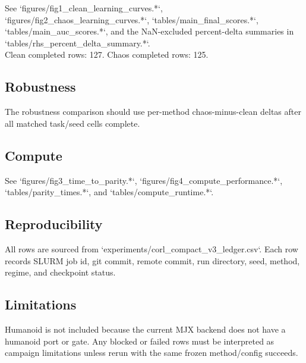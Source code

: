 \documentclass{article}
\begin{document}
See `figures/fig1\_clean\_learning\_curves.*`, `figures/fig2\_chaos\_learning\_curves.*`, `tables/main\_final\_scores.*`, `tables/main\_auc\_scores.*`, and the NaN-excluded percent-delta summaries in `tables/rhs\_percent\_delta\_summary.*`.\\

Clean completed rows: 127. Chaos completed rows: 125.\\

\subsection*{Robustness}

The robustness comparison should use per-method chaos-minus-clean deltas after all matched task/seed cells complete.\\

\subsection*{Compute}

See `figures/fig3\_time\_to\_parity.*`, `figures/fig4\_compute\_performance.*`, `tables/parity\_times.*`, and `tables/compute\_runtime.*`.\\

\subsection*{Reproducibility}

All rows are sourced from `experiments/corl\_compact\_v3\_ledger.csv`. Each row records SLURM job id, git commit, remote commit, run directory, seed, method, regime, and checkpoint status.\\

\subsection*{Limitations}

Humanoid is not included because the current MJX backend does not have a humanoid port or gate. Any blocked or failed rows must be interpreted as campaign limitations unless rerun with the same frozen method/config succeeds.\\
\end{document}
